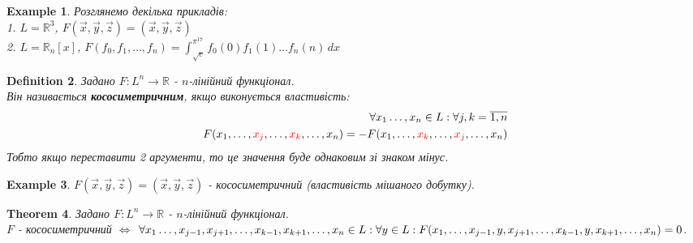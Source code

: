 \documentclass[a4paper, 10pt]{article}
\theoremstyle{theoremdd}
\newtheorem{theorem}{Theorem}[subsection]
\theoremstyle{theoremdd}
\newtheorem{definition}[theorem]{Definition}
\theoremstyle{theoremdd}
\theoremstyle{theoremdd}
\newtheorem{example}[theorem]{Example}
\theoremstyle{theoremdd}
\theoremstyle{theoremdd}
\theoremstyle{theoremdd}
\theoremstyle{theoremdd}
\begin{document}
	\begin{example} Розглянемо декілька прикладів: \\
	1. $L = \mathbb{R}^3$, $F(\vec{x},\vec{y},\vec{z}) = (\vec{x}, \vec{y}, \vec{z})$\\
	2. $L = \mathbb{R}_n[x]$, $F(f_0,f_1,\dots,f_n) = \displaystyle \int_{\sqrt{e}}^{\pi^{17}} f_0(0)f_1(1)\dots f_n(n) \,dx$
	\end{example}
	
	\begin{definition}
	Задано $F: L^n \to \mathbb{R}$ - $n$-лінійний функціонал.\\
	Він називається \textbf{кососиметричним}, якщо виконується властивість:
	\begin{align*}
	\forall x_1 \dots, x_n \in L: \forall j,k = \overline{1,n}\\
	F(x_1, \dots, \textcolor{red}{x_j}, \dots, \textcolor{red}{x_k}, \dots, x_n) = -F(x_1, \dots, \textcolor{red}{x_k}, \dots, \textcolor{red}{x_j}, \dots, x_n)
	\end{align*}
	Тобто якщо переставити 2 аргументи, то це значення буде однаковим зі знаком мінус.
	\end{definition}
	
	\begin{example}
	$F(\vec{x},\vec{y},\vec{z}) = (\vec{x}, \vec{y}, \vec{z})$ - кососиметричний (властивість мішаного добутку).
	\end{example}
	
	\begin{theorem}
	Задано $F: L^n \to \mathbb{R}$ - $n$-лінійний функціонал.\\
	$F$ - кососиметричний $\iff$ $\forall x_1 \dots, x_{j-1}, x_{j+1}, \dots, x_{k-1}, x_{k+1}, \dots, x_{n} \in L: \forall y \in L: \\ F(x_1,\dots, x_{j-1}, y, x_{j+1}, \dots, x_{k-1}, y, x_{k+1}, \dots, x_n) = 0$.
	\end{theorem}
	
\end{document}
